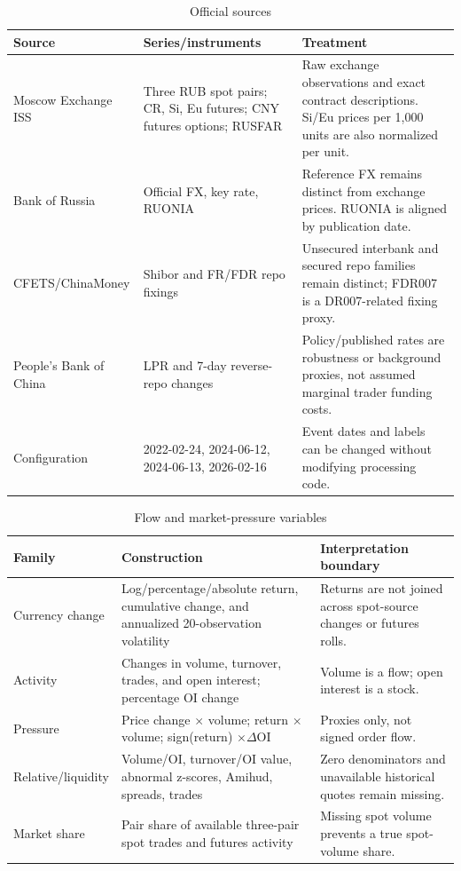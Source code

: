 \begin{table}[ht]
\small
\caption{Official sources}
\begin{tabularx}{\textwidth}{>{\raggedright\arraybackslash}p{3.3cm} X X}
\toprule
Source & Series/instruments & Treatment \\
\midrule
Moscow Exchange ISS & Three RUB spot pairs; CR, Si, Eu futures; CNY futures options; RUSFAR & Raw exchange observations and exact contract descriptions. Si/Eu prices per 1,000 units are also normalized per unit. \\
Bank of Russia & Official FX, key rate, RUONIA & Reference FX remains distinct from exchange prices. RUONIA is aligned by publication date. \\
CFETS/ChinaMoney & Shibor and FR/FDR repo fixings & Unsecured interbank and secured repo families remain distinct; FDR007 is a DR007-related fixing proxy. \\
People's Bank of China & LPR and 7-day reverse-repo changes & Policy/published rates are robustness or background proxies, not assumed marginal trader funding costs. \\
Configuration & 2022-02-24, 2024-06-12, 2024-06-13, 2026-02-16 & Event dates and labels can be changed without modifying processing code. \\
\bottomrule
\end{tabularx}
\end{table}

\begin{table}[ht]
\small
\caption{Flow and market-pressure variables}
\begin{tabularx}{\textwidth}{>{\raggedright\arraybackslash}p{3.2cm} X X}
\toprule
Family & Construction & Interpretation boundary \\
\midrule
Currency change & Log/percentage/absolute return, cumulative change, and annualized 20-observation volatility & Returns are not joined across spot-source changes or futures rolls. \\
Activity & Changes in volume, turnover, trades, and open interest; percentage OI change & Volume is a flow; open interest is a stock. \\
Pressure & Price change $\times$ volume; return $\times$ volume; sign(return) $\times\Delta$OI & Proxies only, not signed order flow. \\
Relative/liquidity & Volume/OI, turnover/OI value, abnormal z-scores, Amihud, spreads, trades & Zero denominators and unavailable historical quotes remain missing. \\
Market share & Pair share of available three-pair spot trades and futures activity & Missing spot volume prevents a true spot-volume share. \\
\bottomrule
\end{tabularx}
\end{table}

